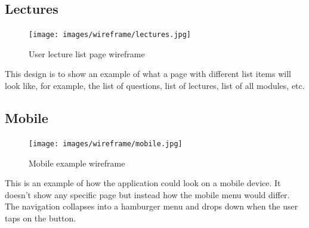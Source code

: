 \subsection{Lectures}
\begin{figure}[H]
    \centering
    \texttt{[image: images/wireframe/lectures.jpg]}
    \caption{User lecture list page wireframe}
    \label{fig:my_label}
\end{figure}
This design is to show an example of what a page with different list items will look like, for example, the list of questions, list of lectures, list of all modules, etc. 

\subsection{Mobile}
\begin{figure}[H]
    \centering
    \texttt{[image: images/wireframe/mobile.jpg]}
    \caption{Mobile example wireframe}
    \label{fig:my_label}
\end{figure}

This is an example of how the application could look on a mobile device. It doesn't show any specific page but instead how the mobile menu would differ. The navigation collapses into a hamburger menu and drops down when the user taps on the button.